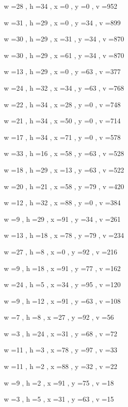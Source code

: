 \documentclass[11pt]{article}
\begin{document}
w =28 , h =34 , x =0 , y =0 , v =952
\par
w =31 , h =29 , x =0 , y =34 , v =899
\par
w =30 , h =29 , x =31 , y =34 , v =870
\par
w =30 , h =29 , x =61 , y =34 , v =870
\par
w =13 , h =29 , x =0 , y =63 , v =377
\par
w =24 , h =32 , x =34 , y =63 , v =768
\par
w =22 , h =34 , x =28 , y =0 , v =748
\par
w =21 , h =34 , x =50 , y =0 , v =714
\par
w =17 , h =34 , x =71 , y =0 , v =578
\par
w =33 , h =16 , x =58 , y =63 , v =528
\par
w =18 , h =29 , x =13 , y =63 , v =522
\par
w =20 , h =21 , x =58 , y =79 , v =420
\par
w =12 , h =32 , x =88 , y =0 , v =384
\par
w =9 , h =29 , x =91 , y =34 , v =261
\par
w =13 , h =18 , x =78 , y =79 , v =234
\par
w =27 , h =8 , x =0 , y =92 , v =216
\par
w =9 , h =18 , x =91 , y =77 , v =162
\par
w =24 , h =5 , x =34 , y =95 , v =120
\par
w =9 , h =12 , x =91 , y =63 , v =108
\par
w =7 , h =8 , x =27 , y =92 , v =56
\par
w =3 , h =24 , x =31 , y =68 , v =72
\par
w =11 , h =3 , x =78 , y =97 , v =33
\par
w =11 , h =2 , x =88 , y =32 , v =22
\par
w =9 , h =2 , x =91 , y =75 , v =18
\par
w =3 , h =5 , x =31 , y =63 , v =15
\par
\newpage
\end{document}
